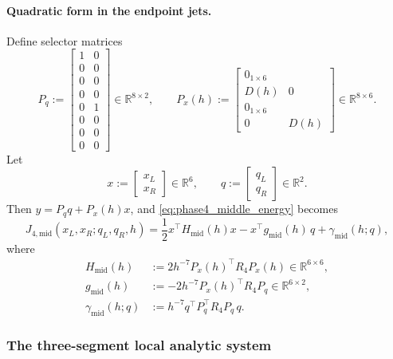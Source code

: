 \paragraph{Quadratic form in the endpoint jets.}
Define selector matrices
\begin{equation}
\label{eq:phase4_selectors}
P_q
:=
\begin{bmatrix}
1&0\\
0&0\\
0&0\\
0&0\\
0&1\\
0&0\\
0&0\\
0&0
\end{bmatrix}
\in\mathbb R^{8\times 2},
\qquad
P_x(h)
:=
\begin{bmatrix}
0_{1\times 6}\\
D(h)&0\\
0_{1\times 6}\\
0&D(h)
\end{bmatrix}
\in\mathbb R^{8\times 6}.
\end{equation}
Let
\[
x:=\begin{bmatrix}x_L\\ x_R\end{bmatrix}\in\mathbb R^6,
\qquad
q:=\begin{bmatrix}q_L\\ q_R\end{bmatrix}\in\mathbb R^2.
\]
Then \(y=P_q q+P_x(h)x\), and \eqref{eq:phase4_middle_energy} becomes
\begin{equation}
\label{eq:phase4_middle_quadratic}
J_{4,\mathrm{mid}}(x_L,x_R;q_L,q_R,h)
=
\frac{1}{2}x^\top H_{\mathrm{mid}}(h)x
-
x^\top g_{\mathrm{mid}}(h)\,q
+
\gamma_{\mathrm{mid}}(h;q),
\end{equation}
where
\begin{align}
\label{eq:phase4_middle_blocks}
H_{\mathrm{mid}}(h)
&:=
2h^{-7}P_x(h)^\top R_4 P_x(h)\in\mathbb R^{6\times 6},\\
g_{\mathrm{mid}}(h)
&:=
-2h^{-7}P_x(h)^\top R_4 P_q\in\mathbb R^{6\times 2},\\
\gamma_{\mathrm{mid}}(h;q)
&:=
h^{-7}q^\top P_q^\top R_4 P_q\,q.
\end{align}

\subsubsection{The three-segment local analytic system}
\label{subsubsec:phase4_three_segment_system}

